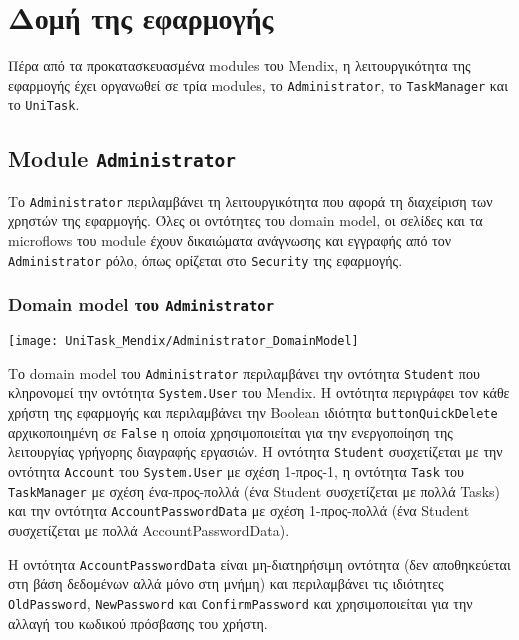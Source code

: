     \section{Δομή της εφαρμογής} \label{sec:unitask_mendix}
        Πέρα από τα προκατασκευασμένα modules του Mendix, η λειτουργικότητα της εφαρμογής έχει οργανωθεί σε τρία modules, το \texttt{Administrator}, το \texttt{TaskManager} και το \texttt{UniTask}.

        \subsection{Module \texttt{Administrator}}
            Το \texttt{Administrator} περιλαμβάνει τη λειτουργικότητα που αφορά τη διαχείριση των χρηστών της εφαρμογής. Όλες οι οντότητες του domain model, οι σελίδες και τα microflows του module έχουν δικαιώματα ανάγνωσης και εγγραφής από τον \texttt{Administrator} ρόλο, όπως ορίζεται στο \texttt{Security} της εφαρμογής.

            \subsubsection{Domain model του \texttt{Administrator}}
                \begin{center}
                    \texttt{[image: UniTask\_Mendix/Administrator\_DomainModel]}
                \end{center}

                Το domain model του \texttt{Administrator} περιλαμβάνει την οντότητα \texttt{Student} που κληρονομεί την οντότητα \texttt{System.User} του Mendix. Η οντότητα περιγράφει τον κάθε χρήστη της εφαρμογής και περιλαμβάνει την Boolean ιδιότητα \texttt{buttonQuickDelete} αρχικοποιημένη σε \texttt{False} η οποία χρησιμοποιείται για την ενεργοποίηση της λειτουργίας γρήγορης διαγραφής εργασιών. Η οντότητα \texttt{Student} συσχετίζεται με την οντότητα \texttt{Account} του \texttt{System.User} με σχέση 1-προς-1, η οντότητα \texttt{Task} του \texttt{TaskManager} με σχέση ένα-προς-πολλά (ένα Student συσχετίζεται με πολλά Tasks) και την οντότητα \texttt{AccountPasswordData} με σχέση 1-προς-πολλά (ένα Student συσχετίζεται με πολλά AccountPasswordData).

                Η οντότητα \texttt{AccountPasswordData} είναι μη-διατηρήσιμη οντότητα (δεν αποθηκεύεται στη βάση δεδομένων αλλά μόνο στη μνήμη) και περιλαμβάνει τις ιδιότητες \texttt{OldPassword}, \texttt{NewPassword} και \texttt{ConfirmPassword} και χρησιμοποιείται για την αλλαγή του κωδικού πρόσβασης του χρήστη.

